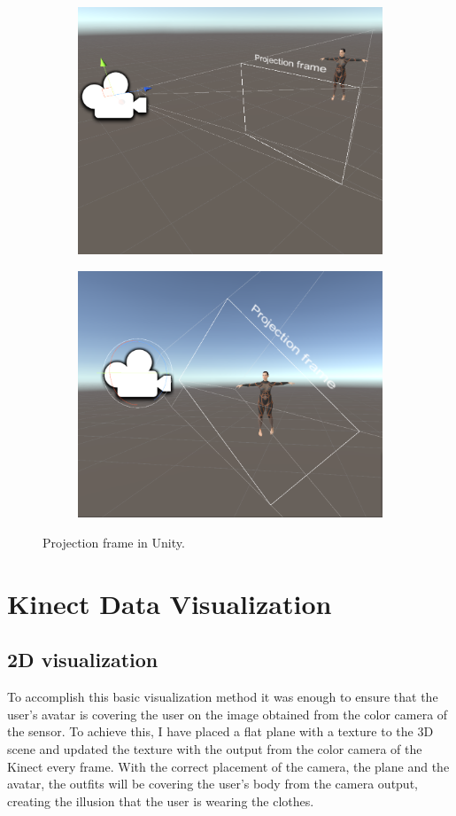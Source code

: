 \documentclass[a4paper]{report}
\begin{document}
\begin{figure}[H]
\centering
\begin{subfigure}{\textwidth}
  \includegraphics[width=.45\textwidth, keepaspectratio]{images/OffAxis/offaxis_demo_1.png}
\end{subfigure}%
\begin{subfigure}{\textwidth}
  \includegraphics[width=.45\textwidth, keepaspectratio]{images/OffAxis/offaxis_demo_2.png}
\end{subfigure}
\caption{Projection frame in Unity.}
\label{fig:offaxis_demo}
\end{figure}
        
        
        
        
        
        
        

\section{Kinect Data Visualization}
\subsection{2D visualization}
\qquad To accomplish this basic visualization method it was enough to ensure that the user's avatar is covering the user on the image obtained from the color camera of the sensor. To achieve this, I have placed a flat plane with a texture to the 3D scene and updated the texture with the output from the color camera of the Kinect every frame.
With the correct placement of the camera, the plane and the avatar, the outfits will be covering the user's body from the camera output, creating the illusion that the user is wearing the clothes.
\end{document}
